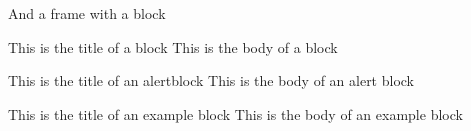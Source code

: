\documentclass[xcolor=svgnames, 10pt]{beamer}
\begin{document}
\begin{frame}{And a frame with a block}
    \begin{block}{This is the title of a block}
    This is the body of a block 
    \end{block}

    \begin{alertblock}{This is the title of an alertblock}
    This is the body of an alert block 
    \end{alertblock}

    \begin{exampleblock}{This is the title of an example block}
    This is the body of an example block 
    \end{exampleblock}

\end{frame}
\end{document}
